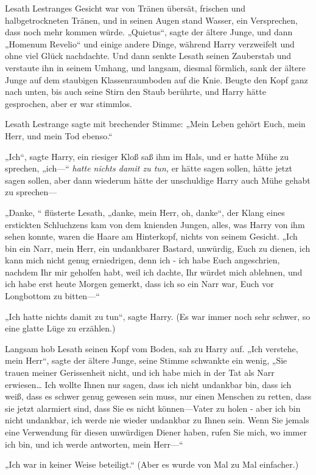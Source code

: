 {Lesath Lestranges Gesicht war von Tränen übersät, frischen und halbgetrockneten Tränen, und in seinen Augen stand Wasser, ein Versprechen, dass noch mehr kommen würde. „Quietus“, sagte der ältere Junge, und dann „Homenum Revelio“ und einige andere Dinge, während Harry verzweifelt und ohne viel Glück nachdachte. Und dann senkte Lesath seinen Zauberstab und verstaute ihn in seinem Umhang, und langsam, diesmal förmlich, sank der ältere Junge auf dem staubigen Klassenraumboden auf die Knie. Beugte den Kopf ganz nach unten, bis auch seine Stirn den Staub berührte, und Harry hätte gesprochen, aber er war stimmlos.

Lesath Lestrange sagte mit brechender Stimme: „Mein Leben gehört Euch, mein Herr, und mein Tod ebenso.“

„Ich“, sagte Harry, ein riesiger Kloß saß ihm im Hals, und er hatte Mühe zu sprechen, „ich—“ \emph{hatte nichts damit zu tun,} er hätte sagen sollen, hätte jetzt sagen sollen, aber dann wiederum hätte der unschuldige Harry auch Mühe gehabt zu sprechen—

„Danke, “ flüsterte Lesath, „danke, mein Herr, oh, danke“, der Klang eines erstickten Schluchzens kam von dem knienden Jungen, alles, was Harry von ihm sehen konnte, waren die Haare am Hinterkopf, nichts von seinem Gesicht. „Ich bin ein Narr, mein Herr, ein undankbarer Bastard, unwürdig, Euch zu dienen, ich kann mich nicht genug erniedrigen, denn ich - ich habe Euch angeschrien, nachdem Ihr mir geholfen habt, weil ich dachte, Ihr würdet mich ablehnen, und ich habe erst heute Morgen gemerkt, dass ich so ein Narr war, Euch vor Longbottom zu bitten—“

„Ich hatte nichts damit zu tun“, sagte Harry. (Es war immer noch sehr schwer, so eine glatte Lüge zu erzählen.)

Langsam hob Lesath seinen Kopf vom Boden, sah zu Harry auf. „Ich verstehe, mein Herr“, sagte der ältere Junge, seine Stimme schwankte ein wenig, „Sie trauen meiner Gerissenheit nicht, und ich habe mich in der Tat als Narr erwiesen… Ich wollte Ihnen nur sagen, dass ich nicht undankbar bin, dass ich weiß, dass es schwer genug gewesen sein muss, nur einen Menschen zu retten, dass sie jetzt alarmiert sind, dass Sie es nicht können—Vater zu holen - aber ich bin nicht undankbar, ich werde nie wieder undankbar zu Ihnen sein. Wenn Sie jemals eine Verwendung für diesen unwürdigen Diener haben, rufen Sie mich, wo immer ich bin, und ich werde antworten, mein Herr—“

„Ich war in keiner Weise beteiligt.“ (Aber es wurde von Mal zu Mal einfacher.)

}
